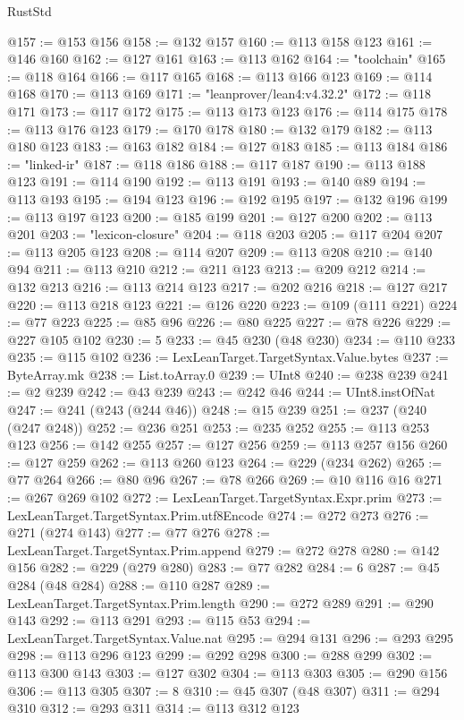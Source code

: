 \begin{lexlean}{RustStd}
\begin{coremodule}
@157 := @153 @156
@158 := @132 @157
@160 := @113 @158 @123
@161 := @146 @160
@162 := @127 @161
@163 := @113 @162
@164 := "toolchain"
@165 := @118 @164
@166 := @117 @165
@168 := @113 @166 @123
@169 := @114 @168
@170 := @113 @169
@171 := "leanprover/lean4:v4.32.2"
@172 := @118 @171
@173 := @117 @172
@175 := @113 @173 @123
@176 := @114 @175
@178 := @113 @176 @123
@179 := @170 @178
@180 := @132 @179
@182 := @113 @180 @123
@183 := @163 @182
@184 := @127 @183
@185 := @113 @184
@186 := "linked-ir"
@187 := @118 @186
@188 := @117 @187
@190 := @113 @188 @123
@191 := @114 @190
@192 := @113 @191
@193 := @140 @89
@194 := @113 @193
@195 := @194 @123
@196 := @192 @195
@197 := @132 @196
@199 := @113 @197 @123
@200 := @185 @199
@201 := @127 @200
@202 := @113 @201
@203 := "lexicon-closure"
@204 := @118 @203
@205 := @117 @204
@207 := @113 @205 @123
@208 := @114 @207
@209 := @113 @208
@210 := @140 @94
@211 := @113 @210
@212 := @211 @123
@213 := @209 @212
@214 := @132 @213
@216 := @113 @214 @123
@217 := @202 @216
@218 := @127 @217
@220 := @113 @218 @123
@221 := @126 @220
@223 := @109 (@111 @221)
@224 := @77 @223
@225 := @85 @96
@226 := @80 @225
@227 := @78 @226
@229 := @227 @105 @102
@230 := 5
@233 := @45 @230 (@48 @230)
@234 := @110 @233
@235 := @115 @102
@236 := LexLeanTarget.TargetSyntax.Value.bytes
@237 := ByteArray.mk
@238 := List.toArray.{0}
@239 := UInt8
@240 := @238 @239
@241 := @2 @239
@242 := @43 @239
@243 := @242 @46
@244 := UInt8.instOfNat
@247 := @241 (@243 (@244 @46))
@248 := @15 @239
@251 := @237 (@240 (@247 @248))
@252 := @236 @251
@253 := @235 @252
@255 := @113 @253 @123
@256 := @142 @255
@257 := @127 @256
@259 := @113 @257 @156
@260 := @127 @259
@262 := @113 @260 @123
@264 := @229 (@234 @262)
@265 := @77 @264
@266 := @80 @96
@267 := @78 @266
@269 := @10 @116 @16
@271 := @267 @269 @102
@272 := LexLeanTarget.TargetSyntax.Expr.prim
@273 := LexLeanTarget.TargetSyntax.Prim.utf8Encode
@274 := @272 @273
@276 := @271 (@274 @143)
@277 := @77 @276
@278 := LexLeanTarget.TargetSyntax.Prim.append
@279 := @272 @278
@280 := @142 @156
@282 := @229 (@279 @280)
@283 := @77 @282
@284 := 6
@287 := @45 @284 (@48 @284)
@288 := @110 @287
@289 := LexLeanTarget.TargetSyntax.Prim.length
@290 := @272 @289
@291 := @290 @143
@292 := @113 @291
@293 := @115 @53
@294 := LexLeanTarget.TargetSyntax.Value.nat
@295 := @294 @131
@296 := @293 @295
@298 := @113 @296 @123
@299 := @292 @298
@300 := @288 @299
@302 := @113 @300 @143
@303 := @127 @302
@304 := @113 @303
@305 := @290 @156
@306 := @113 @305
@307 := 8
@310 := @45 @307 (@48 @307)
@311 := @294 @310
@312 := @293 @311
@314 := @113 @312 @123

\end{coremodule}
\end{lexlean}
